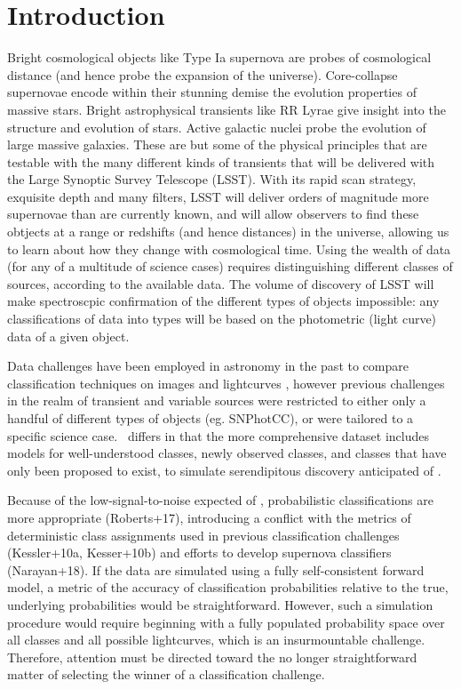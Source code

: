 \section{Introduction}
\label{sec:intro}


Bright cosmological objects like Type Ia supernova are probes of cosmological distance (and hence probe the expansion of the universe).
Core-collapse supernovae encode within their stunning demise the evolution properties of massive stars.
Bright astrophysical transients like RR Lyrae give insight into the structure and evolution of stars.
Active galactic nuclei probe the evolution of large massive galaxies.
These are but some of the physical principles that are testable with the many different kinds of transients that will be delivered with the Large Synoptic Survey Telescope (LSST).
With its rapid scan strategy, exquisite depth and many filters, LSST will deliver orders of magnitude more supernovae than are currently known, and will allow observers to find these obtjects at a range or redshifts (and hence distances) in the universe, allowing us to learn about how they change with cosmological time.
Using the wealth of data (for any of a multitude of science cases) requires distinguishing different classes of sources, according to the available data.
The volume of discovery of LSST will make spectroscpic confirmation of the different types of objects impossible: any classifications of data into types will be based on the photometric (light curve) data of a given object.

Data challenges have been employed in astronomy in the past to compare classification techniques on images  and lightcurves , however previous challenges in the realm of transient and variable sources were restricted to either only a handful of different types of objects (eg. SNPhotCC), or were tailored to a specific science case.
\plasticc\ differs in that the more comprehensive dataset includes models for well-understood classes, newly observed classes, and classes that have only been proposed to exist, to simulate serendipitous discovery anticipated of \lsst.

Because of the low-signal-to-noise expected of \lsst, probabilistic classifications are more appropriate (Roberts+17), introducing a conflict with the metrics of deterministic class assignments used in previous classification challenges (Kessler+10a, Kesser+10b) and efforts to develop supernova classifiers (Narayan+18).
If the data are simulated using a fully self-consistent forward model, a metric of the accuracy of classification probabilities relative to the true, underlying probabilities would be straightforward.
However, such a simulation procedure would require beginning with a fully populated probability space over all classes and all possible lightcurves, which is an insurmountable challenge.
Therefore, attention must be directed toward the no longer straightforward matter of selecting the winner of a classification challenge.

